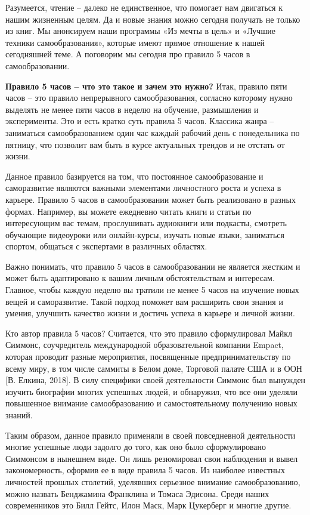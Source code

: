 Разумеется, чтение – далеко не единственное, что помогает нам двигаться к нашим жизненным целям. Да и новые знания можно сегодня получать не только из книг. Мы анонсируем наши программы «Из мечты в цель» и «Лучшие техники самообразования», которые имеют прямое отношение к нашей сегодняшней теме. А поговорим мы сегодня про правило 5 часов в самообразовании.

\textbf{Правило 5 часов – что это такое и зачем это нужно?}
Итак, правило пяти часов – это правило непрерывного самообразования, согласно которому нужно выделять не менее пяти часов в неделю на обучение, размышления и эксперименты. Это и есть кратко суть правила 5 часов. Классика жанра – заниматься самообразованием один час каждый рабочий день с понедельника по пятницу, что позволит вам быть в курсе актуальных трендов и не отстать от жизни.

Данное правило базируется на том, что постоянное самообразование и саморазвитие являются важными элементами личностного роста и успеха в карьере. Правило 5 часов в самообразовании может быть реализовано в разных формах. Например, вы можете ежедневно читать книги и статьи по интересующим вас темам, прослушивать аудиокниги или подкасты, смотреть обучающие видеоуроки или онлайн-курсы, изучать новые языки, заниматься спортом, общаться с экспертами в различных областях.

Важно понимать, что правило 5 часов в самообразовании не является жестким и может быть адаптировано к вашим личным обстоятельствам и интересам. Главное, чтобы каждую неделю вы тратили не менее 5 часов на изучение новых вещей и саморазвитие. Такой подход поможет вам расширить свои знания и умения, улучшить качество жизни и достичь успеха в карьере и личной жизни.

Кто автор правила 5 часов? Считается, что это правило сформулировал Майкл Симмонс, соучредитель международной образовательной компании Empact, которая проводит разные мероприятия, посвященные предпринимательству по всему миру, в том числе саммиты в Белом доме, Торговой палате США и в ООН [В. Елкина, 2018]. В силу специфики своей деятельности Симмонс был вынужден изучить биографии многих успешных людей, и обнаружил, что все они уделяли повышенное внимание самообразованию и самостоятельному получению новых знаний.

Таким образом, данное правило применяли в своей повседневной деятельности многие успешные люди задолго до того, как оно было сформулировано Симмонсом в нынешнем виде. Он лишь резюмировал свои наблюдения и вывел закономерность, оформив ее в виде правила 5 часов. Из наиболее известных личностей прошлых столетий, уделявших серьезное внимание самообразованию, можно назвать Бенджамина Франклина и Томаса Эдисона. Среди наших современников это Билл Гейтс, Илон Маск, Марк Цукерберг и многие другие.

